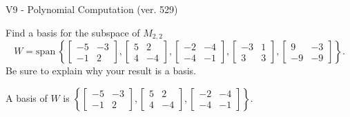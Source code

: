 \begin{exercise}
  \begin{exerciseTitle}V9 - Polynomial Computation (ver. 529)\end{exerciseTitle}
  \begin{exerciseStatement}
    Find a basis for the subspace of \(M_{2,2}\) 
\[W=\mathrm{span}\ \left\{\left[\begin{array}{cc}
-5 & -3 \\
-1 & 2
\end{array}\right] , \left[\begin{array}{cc}
5 & 2 \\
4 & -4
\end{array}\right] , \left[\begin{array}{cc}
-2 & -4 \\
-4 & -1
\end{array}\right] , \left[\begin{array}{cc}
-3 & 1 \\
3 & 3
\end{array}\right] , \left[\begin{array}{cc}
9 & -3 \\
-9 & -9
\end{array}\right]\right\}.\]
 Be sure to explain why your result is a basis.


  \end{exerciseStatement}
  \begin{exerciseAnswer}
   A basis of \(W\) is  \(\left\{\left[\begin{array}{cc}
-5 & -3 \\
-1 & 2
\end{array}\right] , \left[\begin{array}{cc}
5 & 2 \\
4 & -4
\end{array}\right] , \left[\begin{array}{cc}
-2 & -4 \\
-4 & -1
\end{array}\right]\right\}\).
  


  \end{exerciseAnswer}
\end{exercise}